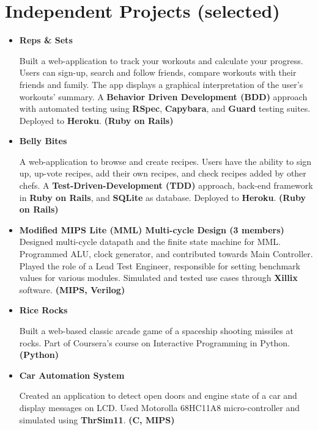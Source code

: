 \documentclass[10pt]{article}%
\begin{document}
\section*{Independent Projects (selected)}

\begin{itemize} \setlength{\parskip}{0.5pt}

\item \textbf{Reps \& Sets}  \href{https://repsandsets.herokuapp.com/}{\tt{\faLink}}

Built a web-application to track your workouts and calculate your progress. Users can sign-up, search and follow friends, compare workouts with their friends and family. The app displays a graphical interpretation of the user's workouts' summary. A \textbf{Behavior Driven Development (BDD)} approach with automated testing using \textbf{RSpec}, \textbf{Capybara}, and \textbf{Guard} testing suites. Deployed to \textbf{Heroku}. \textbf{(Ruby on Rails)}

\item \textbf{Belly Bites}  \href{https://bellybites.herokuapp.com/}{\tt{\faLink}}

A web-application to browse and create recipes. Users have the ability to sign up, up-vote recipes, add their own recipes, and check recipes added by other chefs. A \textbf{Test-Driven-Development (TDD)} approach, back-end framework in \textbf{Ruby on Rails}, and \textbf{SQLite} as database. Deployed to \textbf{Heroku}. \textbf{(Ruby on Rails)}

\item \textbf{Modified MIPS Lite (MML) Multi-cycle Design (3 members)}  \\
Designed multi-cycle datapath and the finite state machine for MML. Programmed ALU, clock generator, and contributed towards Main Controller. Played the role of a Lead Test Engineer, responsible for setting benchmark values for various modules. Simulated and tested use cases through \textbf{Xillix} software. \textbf{(MIPS, Verilog)}

 
\item \textbf{Rice Rocks}  \href{http://www.codeskulptor.org/#user38_DZUIDXywMeaZ0Wx_5.py}{\tt{\faLink}}

Built a web-based classic arcade game of a spaceship shooting missiles at rocks. Part of Coursera's course on Interactive Programming in Python. \textbf{(Python)}


\item \textbf{Car Automation System} 

Created an application to detect open doors and engine state of a car and display messages on LCD. Used Motorolla 68HC11A8 micro-controller and simulated using \textbf{ThrSim11}. \textbf{(C, MIPS)}
\end{itemize}
\end{document}
